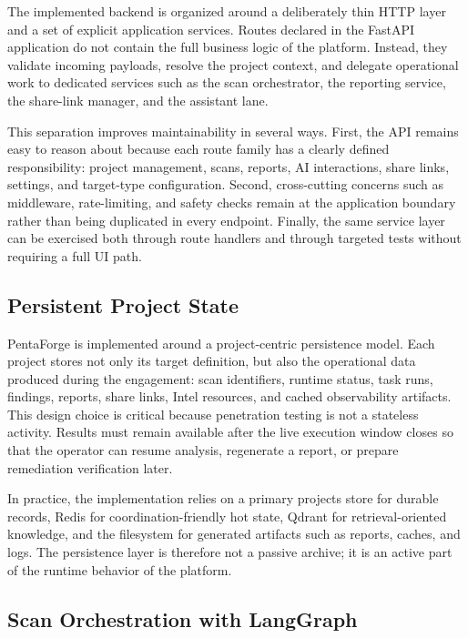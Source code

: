 \documentclass[12pt,a4paper]{report}
\begin{document}
The implemented backend is organized around a deliberately thin HTTP layer and a set
of explicit application services. Routes declared in the FastAPI application do not
contain the full business logic of the platform. Instead, they validate incoming
payloads, resolve the project context, and delegate operational work to dedicated
services such as the scan orchestrator, the reporting service, the share-link
manager, and the assistant lane.

This separation improves maintainability in several ways. First, the API remains easy
to reason about because each route family has a clearly defined responsibility:
project management, scans, reports, AI interactions, share links, settings, and
target-type configuration. Second, cross-cutting concerns such as middleware,
rate-limiting, and safety checks remain at the application boundary rather than being
duplicated in every endpoint. Finally, the same service layer can be exercised both
through route handlers and through targeted tests without requiring a full UI path.

\subsection{Persistent Project State}

PentaForge is implemented around a project-centric persistence model. Each project
stores not only its target definition, but also the operational data produced during
the engagement: scan identifiers, runtime status, task runs, findings, reports,
share links, Intel resources, and cached observability artifacts. This design choice
is critical because penetration testing is not a stateless activity. Results must
remain available after the live execution window closes so that the operator can
resume analysis, regenerate a report, or prepare remediation verification later.

In practice, the implementation relies on a primary projects store for durable
records, Redis for coordination-friendly hot state, Qdrant for retrieval-oriented
knowledge, and the filesystem for generated artifacts such as reports, caches, and
logs. The persistence layer is therefore not a passive archive; it is an active part
of the runtime behavior of the platform.

\subsection{Scan Orchestration with LangGraph}
\end{document}
